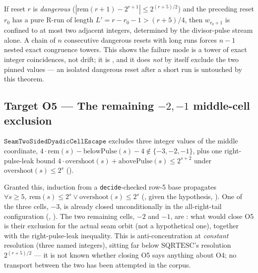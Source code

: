 \begin{obs}
If reset $r$ is \emph{dangerous} ($|\mathrm{rem}(r+1)-2^{r+1}|\le2^{(r+5)/2}$) and the preceding
reset $r_0$ has a pure R-run of length $L'=r-r_0-1>(r+5)/4$, then $w_{r_0+1}$ is confined to at
most two adjacent integers, determined by the divisor-pulse stream alone. A chain of $n$
consecutive dangerous resets with long runs forces $n-1$ nested exact congruence towers. This
shows the failure mode is a tower of exact integer coincidences, not drift; it is , and
it does \emph{not} by itself exclude the two pinned values --- an isolated dangerous reset after a
short run is untouched by this theorem.
\end{obs}

\subsection{Target O5 --- The remaining
\texorpdfstring{\(-2,-1\)}{negative-two, negative-one} middle-cell exclusion}

\begin{defn}
$\mathtt{SeamTwoSidedDyadicCellEscape}$ excludes three integer values of the middle coordinate,
$4\cdot\mathrm{rem}(s)-\mathrm{belowPulse}(s)-4\notin\{-3,-2,-1\}$, plus one right-pulse-leak
bound $4\cdot\mathrm{overshoot}(s)+\mathrm{abovePulse}(s)\le2^{s+2}$ under
$\mathrm{overshoot}(s)\le2^s$ ().
\end{defn}
Granted this, induction from a \texttt{decide}-checked row-5 base propagates
$\forall s\ge5,\ \mathrm{rem}(s)\le2^s\vee\mathrm{overshoot}(s)\le2^s$
(, 
given the hypothesis, ). One of the three cells, $-3$, is already
closed unconditionally in the all-right-tail configuration
(, ).
The two remaining cells, $-2$ and $-1$, are : what would close O5 is their exclusion for the
actual seam orbit (not a hypothetical one), together with the right-pulse-leak inequality. This is
anti-concentration at \emph{constant} resolution (three named integers), sitting far below
$\mathrm{SQRTESC}$'s resolution $2^{(r+5)/2}$ --- it is not known whether closing O5 says anything
about O4; no transport between the two has been attempted in the corpus.

